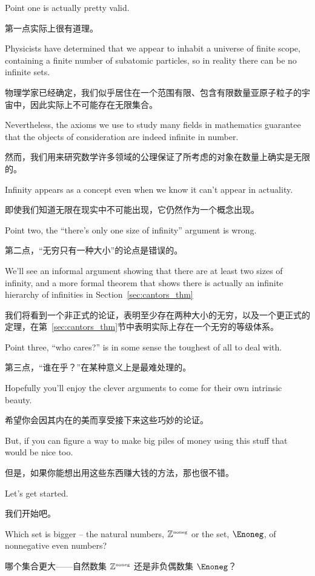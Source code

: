 Point one is actually pretty valid.

第一点实际上很有道理。

Physicists have determined that we
appear to inhabit a universe of finite scope, containing a finite number of
subatomic particles, so in reality there can be no infinite sets.

物理学家已经确定，我们似乎居住在一个范围有限、包含有限数量亚原子粒子的宇宙中，因此实际上不可能存在无限集合。

Nevertheless,
the axioms we use to study many fields in mathematics guarantee that the
objects of consideration are indeed infinite in number.

然而，我们用来研究数学许多领域的公理保证了所考虑的对象在数量上确实是无限的。

Infinity appears as a
concept even when we know it can't appear in actuality.

即使我们知道无限在现实中不可能出现，它仍然作为一个概念出现。

Point two, the ``there's only one size of infinity'' argument is wrong.

第二点，“无穷只有一种大小”的论点是错误的。

We'll
see an informal argument showing that there are at least two sizes of infinity,
and a more formal theorem that shows there is actually an infinite hierarchy
of infinities in Section~\ref{sec:cantors_thm}

我们将看到一个非正式的论证，表明至少存在两种大小的无穷，以及一个更正式的定理，在第~\ref{sec:cantors_thm}节中表明实际上存在一个无穷的等级体系。

Point three, ``who cares?'' is in some sense the toughest of all to deal with.

第三点，“谁在乎？”在某种意义上是最难处理的。

Hopefully you'll enjoy the clever arguments to come for their own intrinsic
beauty.

希望你会因其内在的美而享受接下来这些巧妙的论证。

But, if you can figure a way to make big piles of money using this
stuff that would be nice too.

但是，如果你能想出用这些东西赚大钱的方法，那也很不错。

Let's get started.

我们开始吧。

Which set is bigger -- the natural numbers, ${\mathbb Z}^{\mbox{\tiny noneg}}$ or the set,
$\Enoneg$, of nonnegative even numbers?

哪个集合更大——自然数集 ${\mathbb Z}^{\mbox{\tiny noneg}}$ 还是非负偶数集 $\Enoneg$？

